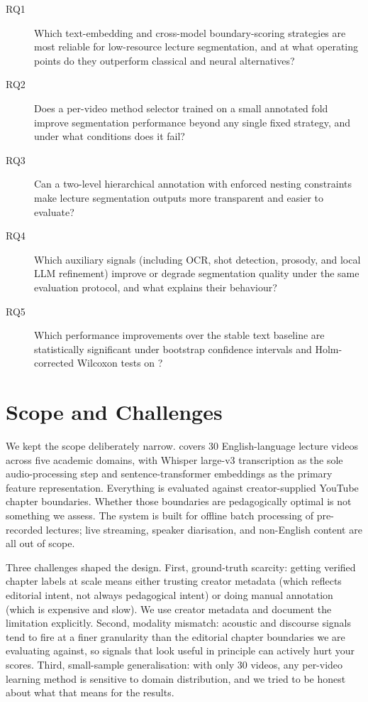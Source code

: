 \begin{description}
  \item[RQ1] Which text-embedding and cross-model boundary-scoring strategies
    are most reliable for low-resource lecture segmentation, and at what
    operating points do they outperform classical and neural alternatives?

  \item[RQ2] Does a per-video method selector trained on a small annotated
    fold improve segmentation performance beyond any single fixed strategy,
    and under what conditions does it fail?

  \item[RQ3] Can a two-level hierarchical annotation with enforced nesting
    constraints make lecture segmentation outputs more transparent and easier
    to evaluate?

  \item[RQ4] Which auxiliary signals (including OCR, shot detection, prosody,
    and local LLM refinement) improve or degrade segmentation quality under
    the same evaluation protocol, and what explains their behaviour?

  \item[RQ5] Which performance improvements over the stable text baseline are
    statistically significant under bootstrap confidence intervals and
    Holm-corrected Wilcoxon tests on \dataset{}?
\end{description}

\section{Scope and Challenges}
\label{sec:scope}

We kept the scope deliberately narrow. \dataset{} covers 30 English-language
lecture videos across five academic domains, with Whisper large-v3
transcription as the sole audio-processing step and sentence-transformer
embeddings as the primary feature representation. Everything is evaluated
against creator-supplied YouTube chapter boundaries. Whether those boundaries
are pedagogically optimal is not something we assess. The system is built for
offline batch processing of pre-recorded lectures; live streaming, speaker
diarisation, and non-English content are all out of scope.

Three challenges shaped the design. First, ground-truth scarcity: getting
verified chapter labels at scale means either trusting creator metadata
(which reflects editorial intent, not always pedagogical intent) or doing
manual annotation (which is expensive and slow). We use creator metadata and
document the limitation explicitly. Second, modality mismatch: acoustic and
discourse signals tend to fire at a finer granularity than the editorial
chapter boundaries we are evaluating against, so signals that look useful in
principle can actively hurt your scores. Third, small-sample generalisation:
with only 30 videos, any per-video learning method is sensitive to domain
distribution, and we tried to be honest about what that means for the results.

